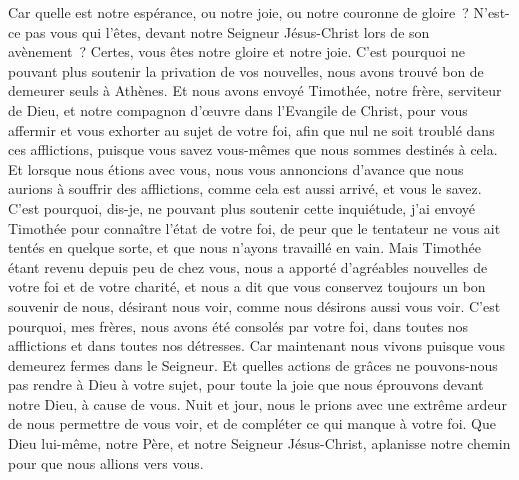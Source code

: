 \begin{multicols}{2}
Car quelle est notre espérance, ou notre joie, ou notre couronne de gloire~? N'est-ce pas vous qui l'êtes, devant notre Seigneur Jésus-Christ lors de son avènement~?
Certes, vous êtes notre gloire et notre joie.
\VerseOne{}C'est pourquoi ne pouvant plus soutenir la privation de vos nouvelles, nous avons trouvé bon de demeurer seuls à Athènes.
Et nous avons envoyé Timothée, notre frère, serviteur de Dieu, et notre compagnon d'œuvre dans l'Evangile de Christ, pour vous affermir et vous exhorter au sujet de votre foi,
afin que nul ne soit troublé dans ces afflictions, puisque vous savez vous-mêmes que nous sommes destinés à cela.
Et lorsque nous étions avec vous, nous vous annoncions d'avance que nous aurions à souffrir des afflictions, comme cela est aussi arrivé, et vous le savez.
C'est pourquoi, dis-je, ne pouvant plus soutenir cette inquiétude, j'ai envoyé Timothée pour connaître l'état de votre foi, de peur que le tentateur ne vous ait tentés en quelque sorte, et que nous n'ayons travaillé en vain.
Mais Timothée étant revenu depuis peu de chez vous, nous a apporté d'agréables nouvelles de votre foi et de votre charité, et nous a dit que vous conservez toujours un bon souvenir de nous, désirant nous voir, comme nous désirons aussi vous voir.
C'est pourquoi, mes frères, nous avons été consolés par votre foi, dans toutes nos afflictions et dans toutes nos détresses.
Car maintenant nous vivons puisque vous demeurez fermes dans le Seigneur.
Et quelles actions de grâces ne pouvons-nous pas rendre à Dieu à votre sujet, pour toute la joie que nous éprouvons devant notre Dieu, à cause de vous.
Nuit et jour, nous le prions avec une extrême ardeur de nous permettre de vous voir, et de compléter ce qui manque à votre foi.
Que Dieu lui-même, notre Père, et notre Seigneur Jésus-Christ, aplanisse notre chemin pour que nous allions vers vous.

\end{multicols}
